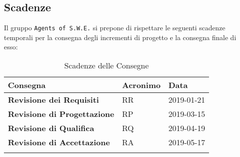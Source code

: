 \newpage

\subsection{Scadenze}
Il gruppo \texttt{Agents of S.W.E.} si prepone di rispettare le seguenti scadenze temporali per la consegna degli incrementi di progetto e la consegna finale di esso:


\begin{longtable}{|C{.40\textwidth}|C{.15\textwidth}|C{.20\textwidth}|}
\hline
\textbf{Consegna} & \textbf{Acronimo} & \textbf{Data}\\
\hline \hline
\endfirsthead

\textbf{Revisione dei Requisiti} & RR & 2019-01-21 \\
\hline
\textbf{Revisione di Progettazione} & RP & 2019-03-15 \\
\hline
\textbf{Revisione di Qualifica} & RQ & 2019-04-19 \\
\hline
\textbf{Revisione di Accettazione} & RA & 2019-05-17 \\
\hline
\caption{Scadenze delle Consegne}
\label{Tabella Scadenze}
\end{longtable}